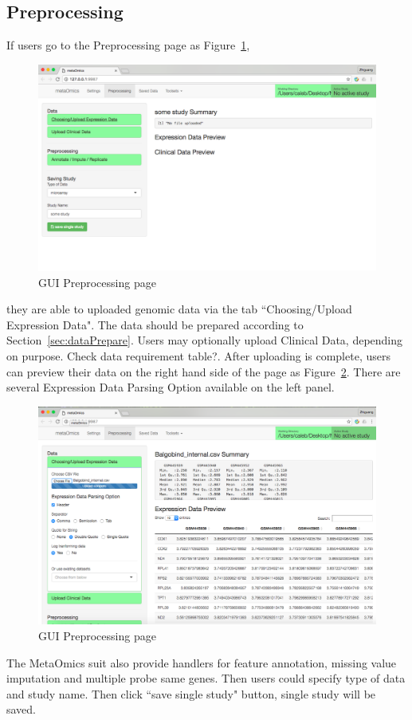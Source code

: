 \subsection{Preprocessing}
If users go to the Preprocessing page as Figure~\ref{fig:GUIpreprocessing},
\begin{figure}[!htbp]
\begin{center}
\includegraphics[scale=0.35]{./figure/GUIpreprocessing}
\caption{GUI Preprocessing page}
\label{fig:GUIpreprocessing}
\end{center}
\end{figure}
they are able to uploaded genomic data via the tab ``Choosing/Upload Expression Data".
The data should be prepared according to Section~\ref{sec:dataPrepare}.
Users may optionally upload Clinical Data, depending on purpose.
{
\color{red}
Check data requirement table?.
}
After uploading is complete,
users can preview their data on the right hand side of the page as Figure~\ref{fig:GUIpreview}.
There are several Expression Data Parsing Option available on the left panel.
\begin{figure}[H]
\begin{center}
\includegraphics[scale=0.35]{./figure/GUIpreview}
\caption{GUI Preprocessing page}
\label{fig:GUIpreview}
\end{center}
\end{figure}
The MetaOmics suit also provide handlers for feature annotation, missing value imputation and multiple probe same genes.
Then users could specify type of data and study name.
Then click ``save single study" button, single study will be saved.

